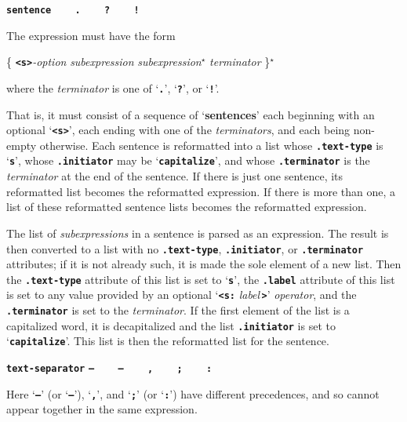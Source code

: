 \documentclass[12pt]{article}
\newcommand{\TT}[1]{{\tt \bfseries #1}}
\newcommand{\key}[1]{{\rm \bfseries #1}}
\newcommand{\ttkey}[1]{{\tt \bfseries #1}}
\newcommand{\STAR}{{\Large $^\star$}}
\newenvironment{indpar}[1][0.3in]%
	{\begin{list}{}%
		     {\setlength{\itemsep}{0in}%
		      \setlength{\topsep}{0in}%
		      \setlength{\parsep}{1ex}%
		      \setlength{\labelwidth}{#1}%
		      \setlength{\leftmargin}{#1}%
		      \addtolength{\leftmargin}{\labelsep}}%
	 \item}%
	{\end{list}}
\begin{document}
\begin{indpar}[1em]
\begin{indpar}[0.5em]
[TBD: maybe not the \TT{.indent} attribute.]

\end{indpar}

\bigskip

\ttkey{sentence} \hfill {} ~~~ \ttkey{.} ~~~ \ttkey{?} ~~~ \ttkey{!}

\begin{indpar}[0.5em]

The expression must have the form
\begin{center}
\{ \TT{<s>}{\em -option} {\em subexpression} {\em subexpression}\STAR{}
	{\em terminator} \}\STAR{}
\end{center}
where the {\em terminator} is one of `\ttkey{.}',
`\ttkey{?}', or `\ttkey{!}'.

That is, it must consist of a sequence of `\key{sentences}' each beginning
with an optional `\TT{<s>}', each ending with one of the {\em terminators},
and each being non-empty otherwise.  Each sentence is reformatted into
a list whose \TT{.text-type} is `\ttkey{s}', whose
\TT{.initiator} may be `\ttkey{capitalize}', and whose
\TT{.terminator} is the {\em terminator} at the end of the sentence.
If there is just one sentence, its reformatted list becomes the
reformatted expression.  If there
is more than one, a list of these reformatted sentence lists
becomes the reformatted expression.

The list of {\em subexpressions} in a sentence is parsed as
an expression.  The result is then converted to a list with no
\TT{.text-type}, \TT{.initiator}, or \TT{.terminator} attributes;
if it is not already such, it is made
the sole element of a new list.  Then the \TT{.text-type} attribute
of this list is set to `\TT{s}', the \TT{.label}
attribute of this list is set to any value provided by
an optional `\TT{<s:} {\em label\,}\TT{>}' {\em operator},
and the
\TT{.terminator} is set to the {\em terminator}.
If the first element of the list is a capitalized word, it is decapitalized
and the list \TT{.initiator} is set to `\TT{capitalize}'.
This list is then the reformatted list for the sentence.

\end{indpar}

\bigskip

\ttkey{text-separator} \hfill \ttkey{--}
				   ~~~ \ttkey{---}
				   ~~~ \ttkey{,}
				   ~~~ \ttkey{;}
				   ~~~ \ttkey{:}

\begin{indpar}[0.5em]
Here `\TT{--}' (or `\TT{---}'),
`\TT{,}', and `\TT{;}' (or `\TT{:}') have different
precedences, and so cannot appear together in the same expression.


\end{indpar}
\end{indpar}
\end{document}
